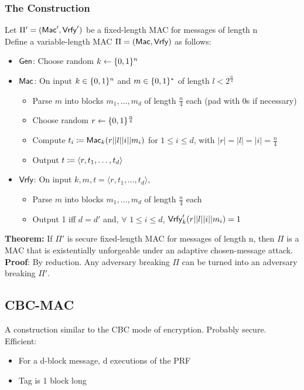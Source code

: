 \documentclass[12pt]{article}
\begin{document}
\subsubsection{The Construction}
Let $\Pi' = (\operatorname{\mathsf{Mac}}',\operatorname{\mathsf{Vrfy}}')$ be a fixed-length MAC for messages of length n\\
Define a variable-length MAC $\Pi = (\operatorname{\mathsf{Mac}},\operatorname{\mathsf{Vrfy}})$ as follows:
\begin{itemize}
\item $\operatorname{\mathsf{Gen}}$: Choose random $k\leftarrow \{0,1\}^n$
\item $\operatorname{\mathsf{Mac}}$: On input $k \in \{0,1\}^n$ and $m \in \{0,1\}^*$ of length $l < 2^{\frac{n}{4}}$
	\begin{itemize}
	\item Parse $m$ into blocks $m_1,\dots,m_d$ of length $\frac{n}{4}$ each (pad with 0s if necessary)
	\item Choose random $r \leftarrow \{0,1\}^{\frac{n}{4}}$
	\item Compute $t_i \coloneqq \operatorname{\mathsf{Mac}}_k(r||l||i||m_i)$ for $1 \le i \le d$, with $|r|=|l|=|i|=\frac{n}{4}$
	\item Output $t\coloneqq \langle r, t_1, \dots, t_d\rangle$
	\end{itemize}
\item $\operatorname{\mathsf{Vrfy}}$: On input $k,m,t = \langle r, t_1, \dots, t_d\rangle$,
	\begin{itemize}
	\item Parse $m$ into blocks $m_1,\dots,m_d$ of length $\frac{n}{4}$ each
	\item Output 1 iff $d=d'$ and, $\forall$ $1\le i\le d$, $\operatorname{\mathsf{Vrfy}}_k'(r||l||i||m_i)=1$ 
	\end{itemize}
\end{itemize}
\textbf{Theorem:} If $\Pi'$ is secure fixed-length MAC for messages of length n, then $\Pi$ is a MAC that is existentially unforgeable under an adaptive chosen-message attack.
\textbf{Proof}: By reduction. Any adversary breaking $\Pi$ can be turned into an adversary breaking $\Pi'$.

\subsection{CBC-MAC}
A construction similar to the CBC mode of encryption. Probably secure. Efficient:
\begin{itemize}
\item For a d-block message, d executions of the PRF
\item Tag is 1 block long
\end{itemize}
\end{document}
